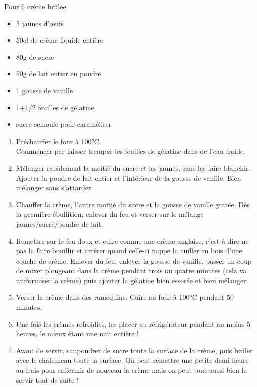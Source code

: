 {Pour 6 crème brûlée}{\begin{itemize}
\item 5 jaunes d'œufs
\item 50cl de crème liquide entière
\item 80g de sucre
\item 50g de lait entier en poudre
\item 1 gousse de vanille
\item 1+1/2 feuilles de gélatine
\item sucre semoule pour caraméliser
\end{itemize}}
{\begin{enumerate}
\item Préchauffer le four à 100°C.\\
Commencer par laisser tremper les feuilles de gélatine dans de l'eau froide.
\item Mélanger rapidement la moitié du sucre et les jaunes, sans les faire blanchir. Ajouter la poudre de lait entier et l'intérieur de la gousse de vanille. Bien mélanger sans s'attarder.
\item Chauffer la crème, l'autre moitié du sucre et la gousse de vanille gratée. Dès la première ébullition, enlever du feu et verser sur le mélange jaunes/sucre/poudre de lait.
\item Remettre sur le feu doux et cuire comme une crème anglaise, c'est à dire ne pas la faire bouillir et arrêter quand celle-ci nappe la cuiller en bois d'une couche de crème. Enlever du feu, enlever la gousse de vanille, passer un coup de mixer plongeant dans la crème pendant trois ou quatre minutes (cela va uniformiser la crème) puis ajouter la gélatine bien essorée et bien mélanger.
\item Verser la crème dans des ramequins. Cuire au four à 100°C pendant 50 minutes.
\item Une fois les crèmes refroidies, les placer au réfrigérateur pendant au moins 5 heures, le mieux étant une nuit entière !
\item Avant de servir, saupoudrer de sucre toute la surface de la crème, puis brûler avec le chalumeau toute la surface. On peut remettre une petite demi-heure au frais pour raffermir de nouveau la crème mais on peut tout aussi bien la servir tout de suite !
\end{enumerate}}

